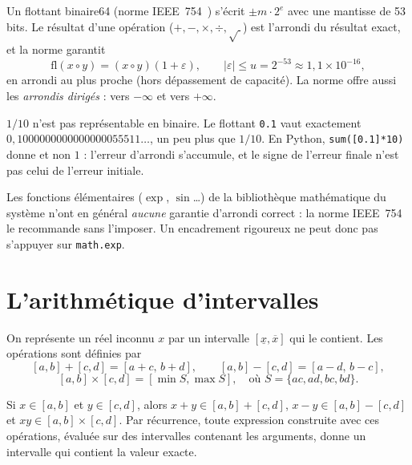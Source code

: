 Un flottant binaire64 (norme IEEE~754~\cite{app:ieee754}) s'écrit $\pm m\cdot2^{e}$ avec une mantisse de 53 bits. Le
résultat d'une opération ($+,-,\times,\div,\sqrt{\ }$) est l'arrondi du résultat exact, et la norme garantit
\[\mathrm{fl}(x\circ y)=(x\circ y)(1+\varepsilon),\qquad|\varepsilon|\le u=2^{-53}\approx1{,}1\times10^{-16},\]
en arrondi au plus proche (hors dépassement de capacité). La norme offre aussi les \emph{arrondis dirigés} : vers
$-\infty$ et vers $+\infty$.

\begin{example}
$1/10$ n'est pas représentable en binaire. Le flottant \texttt{0.1} vaut exactement
$0{,}1000000000000000055511\ldots$, un peu plus que $1/10$. En Python, \texttt{sum([0.1]*10)} donne
 et non $1$ : l'erreur d'arrondi s'accumule, et le signe de l'erreur finale n'est pas celui
de l'erreur initiale.
\end{example}

Les fonctions élémentaires ($\exp$, $\sin$\ldots) de la bibliothèque mathématique du système n'ont en général
\emph{aucune} garantie d'arrondi correct : la norme IEEE~754 le recommande sans l'imposer. Un encadrement rigoureux ne
peut donc pas s'appuyer sur \texttt{math.exp}.

\section{L'arithmétique d'intervalles}\label{appD:sec:intervalles}

\begin{definition}
On représente un réel inconnu $x$ par un intervalle $[\underline x,\overline x]$ qui le contient. Les opérations sont
définies par
\[[a,b]+[c,d]=[a+c,\,b+d],\qquad[a,b]-[c,d]=[a-d,\,b-c],\]
\[[a,b]\times[c,d]=[\min S,\max S],\quad\text{où }S=\{ac,ad,bc,bd\}.\]
\end{definition}

\begin{theorem}\label{appD:thm:inclusion}
Si $x\in[a,b]$ et $y\in[c,d]$, alors $x+y\in[a,b]+[c,d]$, $x-y\in[a,b]-[c,d]$ et $xy\in[a,b]\times[c,d]$. Par
récurrence, toute expression construite avec ces opérations, évaluée sur des intervalles contenant les arguments,
donne un intervalle qui contient la valeur exacte.
\end{theorem}

